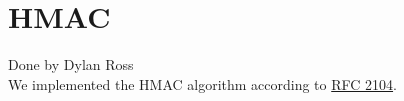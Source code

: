 \section{HMAC}\label{sec:hmac}
Done by Dylan Ross\\

\medskip
We implemented the HMAC algorithm according to \href{https://tools.ietf.org/html/rfc2104}{RFC 2104}.
